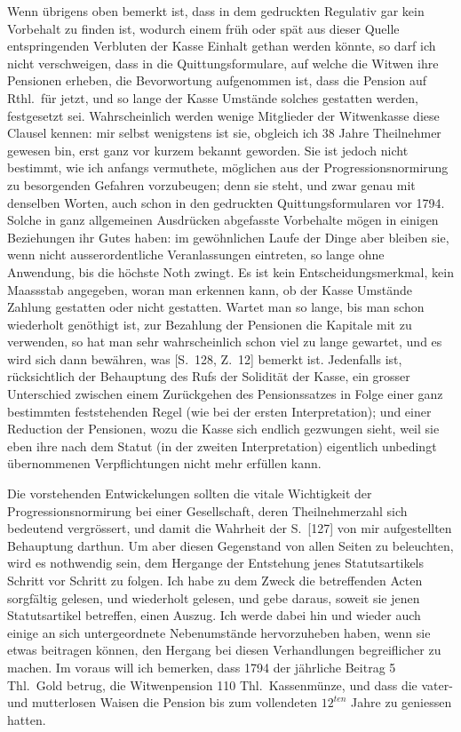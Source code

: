 \documentclass[12pt,a4paper]{article}
\begin{document}
Wenn \"ubrigens oben bemerkt ist, dass in dem gedruckten Regulativ gar kein Vorbehalt zu finden ist, wodurch einem fr\"uh oder sp\"at aus dieser Quelle entspringenden Verbluten der Kasse Einhalt gethan werden k\"onnte, so darf ich nicht verschweigen, dass in die Quittungsformulare, auf welche die Witwen ihre Pensionen erheben, die Bevorwortung aufgenommen ist, dass die Pension auf Rthl.\ f\"ur jetzt, und so lange der Kasse Umst\"ande solches gestatten werden, festgesetzt sei. Wahrscheinlich werden wenige Mitglieder der Witwenkasse diese Clausel kennen: mir selbst wenigstens ist sie, obgleich ich 38 Jahre Theilnehmer gewesen bin, erst ganz vor kurzem bekannt geworden. Sie ist jedoch nicht bestimmt, wie ich anfangs vermuthete, m\"oglichen aus der Progressionsnormirung zu besorgenden Gefahren vorzubeugen; denn sie steht, und zwar genau mit denselben Worten, auch schon in den gedruckten Quittungsformularen vor 1794. Solche in ganz allgemeinen Ausdr\"ucken abgefasste Vorbehalte m\"ogen in einigen Beziehungen ihr Gutes haben: im gew\"ohnlichen Laufe der Dinge aber bleiben sie, wenn nicht ausserordentliche Veranlassungen eintreten, so lange ohne Anwendung, bis die h\"ochste Noth zwingt. Es ist kein Entscheidungsmerkmal, kein Maassstab angegeben, woran man erkennen kann, ob der Kasse Umst\"ande Zahlung gestatten oder nicht gestatten. Wartet man so lange, bis man schon wiederholt gen\"othigt ist, zur Bezahlung der Pensionen die Kapitale mit zu verwenden, so hat man sehr wahrscheinlich schon viel zu lange gewartet, und es wird sich dann bew\"ahren, was [S.\ 128, Z.\ 12] bemerkt ist. Jedenfalls ist, r\"ucksichtlich der Behauptung des Rufs der Solidit\"at der Kasse, ein grosser Unterschied zwischen einem Zur\"uckgehen des Pensionssatzes in Folge einer ganz bestimmten feststehenden Regel (wie bei der ersten Interpretation); und einer Reduction der Pensionen, wozu die Kasse sich endlich gezwungen sieht, weil sie eben ihre nach dem Statut (in der zweiten Interpretation) eigentlich unbedingt \"ubernommenen Verpflichtungen nicht mehr erf\"ullen kann.

Die vorstehenden Entwickelungen sollten die vitale Wichtigkeit der Progressionsnormirung bei einer Gesellschaft, deren Theilnehmerzahl sich bedeutend vergr\"ossert, und damit die Wahrheit der S.\ [127] von mir aufgestellten Behauptung darthun. Um aber diesen Gegenstand von allen Seiten zu beleuchten, wird es nothwendig sein, dem Hergange der Entstehung jenes Statutsartikels Schritt vor Schritt zu folgen. Ich habe zu dem Zweck die betreffenden Acten sorgf\"altig gelesen, und wiederholt gelesen, und gebe daraus, soweit sie jenen Statutsartikel betreffen, einen Auszug. Ich werde dabei hin und wieder auch einige an sich untergeordnete Nebenumst\"ande hervorzuheben haben, wenn sie etwas beitragen k\"onnen, den Hergang bei diesen Verhandlungen begreiflicher zu machen. Im voraus will ich bemerken, dass 1794 der j\"ahrliche Beitrag 5 Thl.\ Gold betrug, die Witwenpension 110 Thl.\ Kassenm\"unze, und dass die vater- und mutterlosen Waisen die Pension bis zum vollendeten $12^{ten}$ Jahre zu geniessen hatten.
\end{document}
